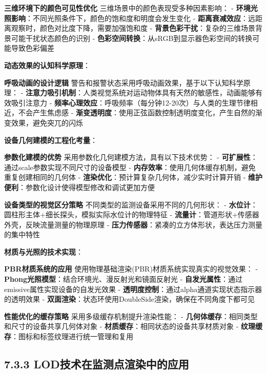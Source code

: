 \textbf{三维环境下的颜色可见性优化} 三维场景中的颜色表现受多种因素影响： - \textbf{环境光照影响}：不同光照条件下，颜色的饱和度和明度会发生变化 - \textbf{距离衰减效应}：远距离观察时，颜色对比度下降，需要加强饱和度 - \textbf{背景色彩干扰}：复杂的三维场景背景可能干扰状态颜色的识别 - \textbf{色彩空间转换}：从sRGB到显示器色彩空间的转换可能导致色彩偏差

\textbf{动态效果的认知科学原理}：

\textbf{呼吸动画的设计逻辑} 警告和报警状态采用呼吸动画效果，基于以下认知科学原理： - \textbf{注意力吸引机制}：人类视觉系统对运动物体具有天然的敏感性，动画能够有效吸引注意力 - \textbf{频率心理效应}：呼吸频率（每分钟12-20次）与人类的生理节律相近，不会产生焦虑感 - \textbf{渐变透明度}：使用正弦函数控制透明度变化，产生自然的渐变效果，避免突兀的闪烁

\textbf{设备几何建模的工程化考量}：

\textbf{参数化建模的优势} 采用参数化几何建模方法，具有以下技术优势： - \textbf{可扩展性}：通过scale参数实现不同尺寸的设备模型 - \textbf{内存效率}：使用几何体缓存机制，避免重复创建相同的几何体 - \textbf{渲染优化}：预计算复杂几何体，减少实时计算开销 - \textbf{维护便利}：参数化设计使得模型修改和调试更加方便

\textbf{设备类型的视觉区分策略} 不同类型的监测设备采用不同的几何形状： - \textbf{水位计}：圆柱形主体+细长探头，模拟实际水位计的物理特征 - \textbf{流量计}：管道形状+传感器外壳，反映流量测量的物理原理 - \textbf{压力传感器}：紧凑的立方体形状，表达压力测量的集中特性

\textbf{材质与光照的技术实现}：

\textbf{PBR材质系统的应用} 使用物理基础渲染(PBR)材质系统实现真实的视觉效果： - \textbf{Phong光照模型}：结合环境光、漫反射光和镜面反射光 - \textbf{自发光属性}：通过emissive属性实现设备的自发光效果 - \textbf{透明度控制}：通过alpha通道实现状态指示器的透明效果 - \textbf{双面渲染}：状态环使用DoubleSide渲染，确保在不同角度下都可见

\textbf{性能优化的缓存策略} 采用多级缓存机制提升渲染性能： - \textbf{几何体缓存}：相同类型和尺寸的设备共享几何体对象 - \textbf{材质缓存}：相同状态的设备共享材质对象 - \textbf{纹理缓存}：图标和标签纹理进行统一管理和复用

\subsection{7.3.3 LOD技术在监测点渲染中的应用}\label{lodux6280ux672fux5728ux76d1ux6d4bux70b9ux6e32ux67d3ux4e2dux7684ux5e94ux7528}

